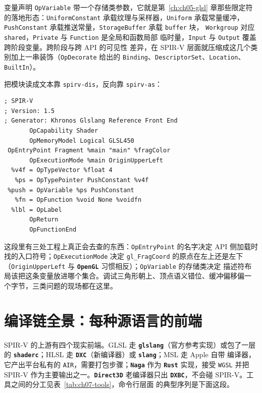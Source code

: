 \documentclass[12pt,a4paper,fontset=fandol]{ctexbook}
\newcommand{\Tp}[1]{\texttt{#1}}
\newcommand{\Bk}{\discretionary{}{}{}}
\newcommand{\Lib}[1]{\textbf{\texttt{#1}}}
\newcommand{\Lang}[1]{\textsf{#1}}
\newcommand{\GSL}{\Lang{GLSL}}
\newcommand{\HSL}{\Lang{HLSL}}
\newcommand{\MSL}{\Lang{MSL}}
\newcommand{\SPIV}{\Lang{SPIR-V}}
\begin{document}
变量声明 \Tp{OpVariable} 带一个存储类参数，它就是第~\ref{ch:ch05-glsl} 章那些限定符
的落地形态：\Tp{UniformConstant} 承载纹理与采样器，\Tp{Uniform} 承载常量缓冲，
\Tp{PushConstant} 承载推送常量，\Tp{StorageBuffer} 承载 \Tp{buffer} 块，
\Tp{Workgroup} 对应 \Tp{shared}，\Tp{Private} 与 \Tp{Function} 是全局和函数局部
临时量，\Tp{Input} 与 \Tp{Output} 覆盖跨阶段变量。跨阶段与跨 API 的可见性
差异，在 \SPIV{} 层面就压缩成这几个类别加上一串装饰（\Tp{OpDecorate} 给出的
\Tp{Binding}、\Tp{DescriptorSet}、\Tp{Location}、\Tp{BuiltIn}）。

把模块读成文本靠 \Tp{spirv\Bk-dis}，反向靠 \Tp{spirv\Bk-as}：

\begin{lstlisting}[style=shellstyle,caption={反汇编片段：入口、执行模式与两种存储类的变量声明},label={lst:ch07-dis}]
; SPIR-V
; Version: 1.5
; Generator: Khronos Glslang Reference Front End
       OpCapability Shader
       OpMemoryModel Logical GLSL450
 OpEntryPoint Fragment %main "main" %fragColor
       OpExecutionMode %main OriginUpperLeft
  %v4f = OpTypeVector %float 4
   %ps = OpTypePointer PushConstant %v4f
 %push = OpVariable %ps PushConstant
   %fn = OpFunction %void None %voidfn
  %lbl = OpLabel
       OpReturn
       OpFunctionEnd
\end{lstlisting}

这段里有三处工程上真正会去查的东西：\Tp{Op\Bk EntryPoint} 的名字决定 API 侧加载时
找的入口符号；\Tp{Op\Bk ExecutionMode} 决定 \Tp{gl\_FragCoord} 的原点在左上还是左下
（\Tp{Origin\Bk UpperLeft} 与 \Lib{OpenGL} 习惯相反）；\Tp{OpVariable} 的存储类决定
描述符布局该把这条变量放进哪个集合。调试三角形朝上、顶点语义错位、缓冲偏移偏一
个字节，三类问题的现场都在这里。

\section{编译链全景：每种源语言的前端}

\SPIV{} 的上游有四个现实前端。\GSL{} 走 \Lib{glslang}（官方参考实现）或包了一层的
\Lib{shaderc}；\HSL{} 走 \Lib{DXC}（新编译器）或 \Lib{slang}；\MSL{} 走 Apple 自带
编译器，它产出平台私有的 \Tp{AIR}，需要打包步骤；\Lib{Naga} 作为 \Lib{Rust}
实现，接受 \Tp{WGSL} 并把 \SPIV{} 作为主要输出之一。\Lib{Direct3D} 老编译器只出
\Lib{DXBC}，不会碰 \SPIV{}。工具之间的分工见表~\ref{tab:ch07-tools}，命令行层面
的典型序列是下面这段。
\end{document}
